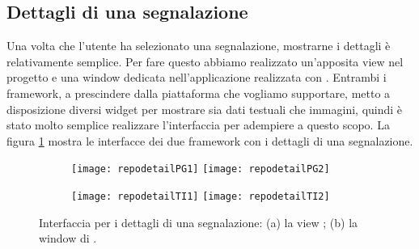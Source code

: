 		\subsection{Dettagli di una segnalazione}
		\label{subsec:dettagli}
			Una volta che l'utente ha selezionato una segnalazione, mostrarne i 
			dettagli è relativamente semplice. Per fare questo abbiamo 
			realizzato un'apposita view \kendomob{} nel progetto \pg{} e una 
			window dedicata nell'applicazione realizzata con \tisdk{}. Entrambi i 
			framework, a prescindere dalla piattaforma che vogliamo supportare, 
			metto a disposizione diversi widget per mostrare sia dati testuali 
			che immagini, quindi è stato molto semplice realizzare l'interfaccia 
			per adempiere a questo scopo. La figura \ref{fig:repodetails}
			mostra le interfacce dei due framework con i dettagli di una
			segnalazione.
			\begin{figure}[h]
				\centering
				\begin{subfigure}[b]{0.9\textwidth}
					\texttt{[image: repodetailPG1]}
					\texttt{[image: repodetailPG2]}
					\caption{}
				\end{subfigure}
				\begin{subfigure}[b]{0.9\textwidth}
					\texttt{[image: repodetailTI1]}
					\texttt{[image: repodetailTI2]}
					\caption{}
				\end{subfigure}
				\caption{
					Interfaccia per i dettagli di una segnalazione: (a) la view
					\kendomob{}; (b) la window di \tisdk{}.
				}
				\label{fig:repodetails}
			\end{figure}
			
